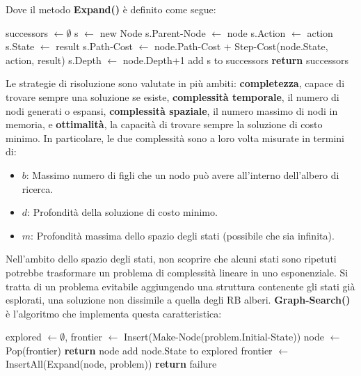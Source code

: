 \noindent Dove il metodo \textbf{Expand()} è definito come segue: \begin{algorithm}[h]
    \caption{Expand(node, problem) \textbf{returns} set of nodes}
    \begin{algorithmic}[i]
        \State successors $\gets \emptyset$
            \State s $\gets$ new Node
            \State s.Parent-Node $\gets$ node
            \State s.Action $\gets$ action
            \State s.State $\gets$ result
            \State s.Path-Cost $\gets$ node.Path-Cost + Step-Cost(node.State, action, result)
            \State s.Depth $\gets$ node.Depth+1
            \State add s to successors
        \EndFor
        \State \textbf{return} successors
    \end{algorithmic}
\end{algorithm}

\noindent Le strategie di risoluzione sono valutate in più ambiti: \textbf{completezza}, capace di trovare sempre una soluzione se esiste,
\textbf{complessità temporale}, il numero di nodi generati o espansi, \textbf{complessità spaziale}, il numero massimo di nodi in memoria, e
\textbf{ottimalità}, la capacità di trovare sempre la soluzione di costo minimo. In particolare, le due complessità sono a loro volta misurate in
termini di: \begin{itemize}
    \item $b$: Massimo numero di figli che un nodo può avere all'interno dell'albero di ricerca.
    \item $d$: Profondità della soluzione di costo minimo.
    \item $m$: Profondità massima dello spazio degli stati (possibile che sia infinita).
\end{itemize}

\noindent Nell'ambito dello spazio degli stati, non scoprire che alcuni stati sono ripetuti potrebbe trasformare un problema di complessità lineare in
uno esponenziale. Si tratta di un problema evitabile aggiungendo una struttura contenente gli stati già esplorati, una soluzione non dissimile a quella
degli RB alberi. \textbf{Graph-Search()} è l'algoritmo che implementa questa caratteristica: \begin{algorithm}[h]
    \caption{Graph-Search(problem, frontier) \textbf{return} solution or failure}
    \begin{algorithmic}[i]
        \State explored $\gets\emptyset$, frontier $\gets$ Insert(Make-Node(problem.Initial-State))
            \State node $\gets$ Pop(frontier)
             \textbf{return} node
            \EndIf
                \State add node.State to explored
                \State frontier $\gets$ InsertAll(Expand(node, problem))
            \EndIf
        \EndWhile
        \State \textbf{return} failure
    \end{algorithmic}
\end{algorithm}

